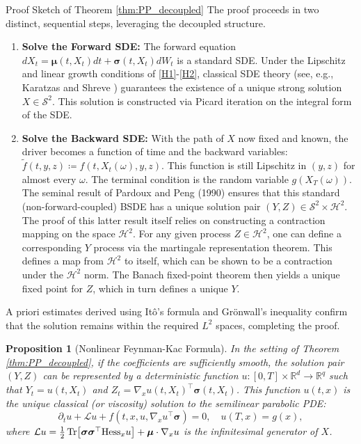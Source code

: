 \documentclass[11pt,letterpaper,oneside]{article}
\theoremstyle{plain}
\newtheorem{proposition}[theorem]{Proposition}
\theoremstyle{definition}
\theoremstyle{remark}
\begin{document}
\begin{leanproofbox}{Proof Sketch of Theorem \ref{thm:PP_decoupled}}
The proof proceeds in two distinct, sequential steps, leveraging the decoupled structure.
\begin{enumerate}
    \item \textbf{Solve the Forward SDE:} The forward equation \(dX_t = \bm\mu(t,X_t)dt + \bm\sigma(t,X_t)dW_t\) is a standard SDE. Under the Lipschitz and linear growth conditions of \ref{H1}-\ref{H2}, classical SDE theory (see, e.g., Karatzas and Shreve \cite{KaratzasShreve1991}) guarantees the existence of a unique strong solution \(X \in \mathcal S^2\). This solution is constructed via Picard iteration on the integral form of the SDE.
    \item \textbf{Solve the Backward SDE:} With the path of \(X\) now fixed and known, the driver becomes a function of time and the backward variables: \(\tilde{f}(t,y,z) \coloneqq f(t,X_t(\omega),y,z)\). This function is still Lipschitz in \((y,z)\) for almost every \(\omega\). The terminal condition is the random variable \(g(X_T(\omega))\). The seminal result of Pardoux and Peng (1990) \cite{PardouxPeng1990} ensures that this standard (non-forward-coupled) BSDE has a unique solution pair \((Y,Z) \in \mathcal S^2 \times \mathcal H^2\). The proof of this latter result itself relies on constructing a contraction mapping on the space \(\mathcal{H}^2\). For any given process \(Z \in \mathcal{H}^2\), one can define a corresponding \(Y\) process via the martingale representation theorem. This defines a map from \(\mathcal{H}^2\) to itself, which can be shown to be a contraction under the \(\mathcal{H}^2\) norm. The Banach fixed-point theorem then yields a unique fixed point for \(Z\), which in turn defines a unique \(Y\).
\end{enumerate}
A priori estimates derived using Itô's formula and Grönwall's inequality confirm that the solution remains within the required \(L^2\) spaces, completing the proof.
\end{leanproofbox}

\begin{proposition}[Nonlinear Feynman-Kac Formula]
\label{prop:feynman_kac}
In the setting of Theorem \ref{thm:PP_decoupled}, if the coefficients are sufficiently smooth, the solution pair \((Y,Z)\) can be represented by a deterministic function \(u: [0,T] \times \mathbb{R}^d \to \mathbb{R}^q\) such that \(Y_t = u(t,X_t)\) and \(Z_t = \nabla_x u(t,X_t)^\top \bm\sigma(t,X_t)\). This function \(u(t,x)\) is the unique classical (or viscosity) solution to the semilinear parabolic PDE:
\[
\partial_t u + \mathcal L u + f(t,x,u,\nabla_x u^\top \bm\sigma)=0, \quad u(T,x) = g(x),
\]
where \(\mathcal{L}u = \frac{1}{2}\Tr[\bm\sigma\bm\sigma^\top \mathrm{Hess}_x u] + \bm\mu \cdot \nabla_x u\) is the infinitesimal generator of \(X\).
\end{proposition}
\end{document}
